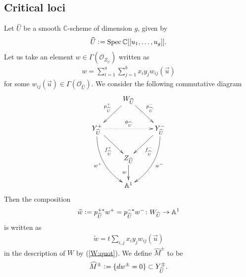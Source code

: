 \documentclass[11pt]{amsart}
\theoremstyle{plain}
\newcommand{\oO}{\mathcal{O}}
\newcommand{\Spec}{\mathop{\rm Spec}\nolimits}
\begin{document}
\subsection{Critical loci}\label{subsec:crit}
Let $\widehat{U}$ be a smooth 
$\mathbb{C}$-scheme of dimension $g$, 
given by
\begin{align*}
\widehat{U} \cneq \Spec \mathbb{C}[[u_1, \ldots, u_g]].
\end{align*}
Let us take  
an element $w \in \Gamma(\oO_{Z_{\widehat{U}}})$ written as 
\begin{align}\label{def:g}
w=\sum_{i=1}^a \sum_{j=1}^b x_i y_j w_{ij}(\vec{u})
\end{align}
for some $w_{ij}(\vec{u}) \in \Gamma(\oO_{\widehat{U}})$. 
We consider the following commutative diagram
\begin{align}\label{def:pm0}
\xymatrix{
& W_{\widehat{U}} \ar[ld]_-{p_{\widehat{U}}^+} \ar[rd]^-{p_{\widehat{U}}^-} & \\
Y^{+}_{\widehat{U}} \ar[rd]_-{f_{\widehat{U}}^+}
\ar@/_15pt/[rdd]_-{w^{+}}  \ar@{.>}[rr]^-{\phi_{\widehat{U}}}& &
 Y^{-}_{\widehat{U}} 
\ar[ld]^-{f_{\widehat{U}}^-}
\ar@/^15pt/[ldd]^-{w^-}\\
& Z_{\widehat{U}} \ar[d]_-{w} &  \\
& \mathbb{A}^1 &
}
\end{align}
Then the composition 
\begin{align*}
\widetilde{w} \cneq p_{\widehat{U}}^{+\ast}w^{+}=p_{\widehat{U}}^{-\ast}w^- \colon W_{\widehat{U}} \to \mathbb{A}^1
\end{align*}
is written as 
\begin{align}\label{w:tilde}
\widetilde{w}=t \sum_{i, j} x_i y_j w_{ij}(\vec{u})
\end{align}
in the description of $W$ by (\ref{W:quot}). 
We define $\widehat{M}^{\pm}$ to be
\begin{align*}
\widehat{M}^{\pm} \cneq 
\{dw^{\pm}=0\}
\subset Y_{\widehat{U}}^{\pm}.
\end{align*}
\end{document}
